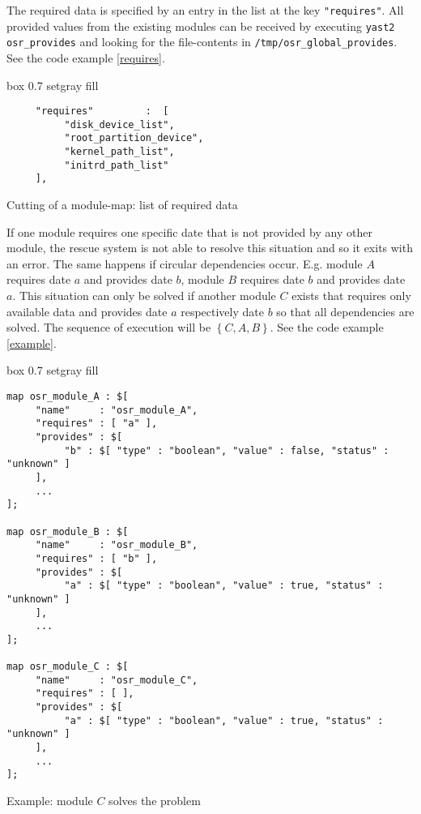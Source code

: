 The required data is specified by an entry in the list at the key
\verb+"requires"+. All provided values from the existing modules can be
received by executing \verb+yast2 osr_provides+ and looking for the
file-contents in \verb+/tmp/osr_global_provides+. See the code example
\ref{requires}.\\

\begin{program}[h!]
\begin{boxitpara}{box 0.7 setgray fill}
{\footnotesize \begin{verbatim}
     "requires"         :  [
          "disk_device_list",
          "root_partition_device",
          "kernel_path_list",
          "initrd_path_list"
     ],
\end{verbatim}}
\end{boxitpara}
\caption{Cutting of a module-map: list of required data}
\label{requires}
\end{program}

If one module requires one specific date that is not provided by any
other module, the rescue system is not able to resolve this situation
and so it exits with an error. The same happens if circular dependencies
occur. E.g. module $A$ requires date $a$ and provides date $b$, module
$B$ requires date $b$ and provides date $a$. This situation can only be
solved if another module $C$ exists that requires only available data
and provides date $a$ respectively date $b$ so that all dependencies
are solved. The sequence of execution will be $\left\{ C, A, B \right\}$.
See the code example \ref{example}.\\

\begin{program}[h!]
\begin{boxitpara}{box 0.7 setgray fill}
{\footnotesize \begin{verbatim}
map osr_module_A : $[
     "name"     : "osr_module_A",
     "requires" : [ "a" ],
     "provides" : $[ 
          "b" : $[ "type" : "boolean", "value" : false, "status" : "unknown" ]
     ],
     ...
];

map osr_module_B : $[
     "name"     : "osr_module_B",
     "requires" : [ "b" ],
     "provides" : $[ 
          "a" : $[ "type" : "boolean", "value" : true, "status" : "unknown" ]
     ],
     ...
];

map osr_module_C : $[
     "name"     : "osr_module_C",
     "requires" : [ ],
     "provides" : $[ 
          "a" : $[ "type" : "boolean", "value" : true, "status" : "unknown" ]
     ],
     ...
];
\end{verbatim}}%
\end{boxitpara}
\caption{Example: module $C$ solves the problem}
\label{example}
\end{program}

